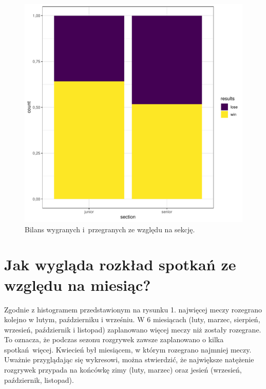 \documentclass{mwart}\usepackage[]{graphicx}\usepackage[]{xcolor}
\makeatletter
\def\maxwidth{ %
  \ifdim\Gin@nat@width>\linewidth
    \linewidth
  \else
    \Gin@nat@width
  \fi
}
\newenvironment{knitrout}{}{} %
\makeatother
\begin{document}
\begin{knitrout}
\color{fgcolor}\begin{figure}
\includegraphics[width=\maxwidth]{figure/unnamed-chunk-3-1} \caption[Bilans wygranych i przegranych ze względu na sekcję]{Bilans wygranych i przegranych ze względu na sekcję.}\label{fig:unnamed-chunk-3}
\end{figure}

\end{knitrout}
\section {Jak wygląda rozkład spotkań ze względu na miesiąc?}

Zgodnie z histogramem przedstawionym na rysunku 1. najwięcej meczy rozegrano kolejno w lutym, październiku i wrześniu. W 6 miesiącach (luty, marzec, sierpień, wrzesień, październik i listopad) zaplanowano więcej meczy niż zostały rozegrane. To oznacza, że podczas sezonu rozgrywek zawsze zaplanowano o kilka spotkań więcej. Kwiecień był miesiącem, w którym rozegrano najmniej meczy. Uważnie przyglądając się wykresowi, można stwierdzić, że największe natężenie rozgrywek przypada na końcówkę zimy (luty, marzec) oraz jesień (wrzesień, październik, listopad). 
\end{document}

